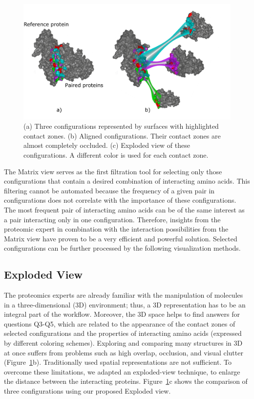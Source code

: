 \documentclass[twocolumn]{bmcart}%
\def\ExpView {Exploded view\xspace}
\def\MatView {Matrix view\xspace}
\begin{document}
\begin{figure}[tb]
    \centering
    \includegraphics[width=1.6\columnwidth]{images/figure5.pdf}
    \caption{
    (a) Three configurations represented by surfaces with highlighted contact zones. (b) Aligned configurations. Their contact zones are almost completely occluded. (c) \ExpView of these configurations. A different color is used for each contact zone.}
	\label{fig:case12}
\end{figure}

The \MatView serves as the first filtration tool for selecting only those configurations that contain a desired combination of interacting amino acids.
This filtering cannot be automated because the frequency of a given pair in configurations does not correlate with the importance of these configurations.
The most frequent pair of interacting amino acids can be of the same interest as a pair interacting only in one configuration.
Therefore, insights from the proteomic expert in combination with the interaction possibilities from the \MatView have proven to be a very efficient and powerful solution.
Selected configurations can be further processed by the following visualization methods.



\subsection*{Exploded View}
The proteomics experts are already familiar with the manipulation of molecules in a three-dimensional (3D) environment; thus, a 3D representation has to be an integral part of the workflow.
Moreover, the 3D space helps to find answers for questions Q3-Q5, which are related to the appearance of the contact zones of selected configurations and the properties of interacting amino acids (expressed by different coloring schemes).
Exploring and comparing many structures in 3D at once suffers from problems such as high overlap, occlusion, and visual clutter (Figure~\ref{fig:case12}b). 
Traditionally used spatial representations are not sufficient.
To overcome these limitations, we adapted an exploded-view technique, to enlarge the distance between the interacting proteins. 
Figure~\ref{fig:case12}c shows the comparison of three configurations using our proposed \ExpView.
\end{document}
